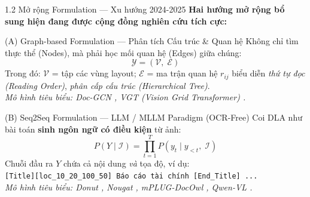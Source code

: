 \documentclass[aspectratio=1610,8pt]{beamer}
\begin{document}
\begin{frame}{1.2 \; Mở rộng Formulation — Xu hướng 2024-2025}
    \textbf{Hai hướng mở rộng bổ sung hiện đang được cộng đồng nghiên cứu tích cực:}

    \vspace{0.5em}
    \begin{block}{(A) Graph-based Formulation — Phân tích Cấu trúc \& Quan hệ}
        Không chỉ tìm thực thể (Nodes), mà phải học mối quan hệ (Edges) giữa chúng:
        $$\mathcal{Y} = (\mathcal{V},\; \mathcal{E})$$
        Trong đó: $\mathcal{V}$ = tập các vùng layout; $\mathcal{E}$ = ma trận quan hệ $r_{ij}$ biểu diễn
        \textit{thứ tự đọc (Reading Order)}, \textit{phân cấp cấu trúc (Hierarchical Tree)}.\\
        \textit{Mô hình tiêu biểu: Doc-GCN \cite{dla_2022_coling_2022_doc_gcn_heterogeneous_graph_convolutional_networks_for_document}, VGT (Vision Grid Transformer) \cite{dla_2023_iccv_2023_vision_grid_transformer_for_document_layout_analysis_pdf}.}
    \end{block}

    \vspace{0.4em}
    \begin{block}{(B) Seq2Seq Formulation — LLM / MLLM Paradigm (OCR-Free)}
        Coi DLA như bài toán \textbf{sinh ngôn ngữ có điều kiện} từ ảnh:
        $$P(Y \mid \mathcal{I}) = \prod_{t=1}^{T} P\!\left(y_t \mid y_{<t},\; \mathcal{I}\right)$$
        Chuỗi đầu ra $Y$ chứa cả nội dung \textit{và} tọa độ, ví dụ:\\
        {\small\texttt{[Title][loc\_10\_20\_100\_50] Báo cáo tài chính [End\_Title] ...}}\\
        \textit{Mô hình tiêu biểu: Donut \cite{kim2022donut}, Nougat \cite{nougat_2023}, mPLUG-DocOwl \cite{ye2023mplugdocowl}, Qwen-VL \cite{qwen2vl_2023}.}
    \end{block}
\end{frame}
\end{document}

